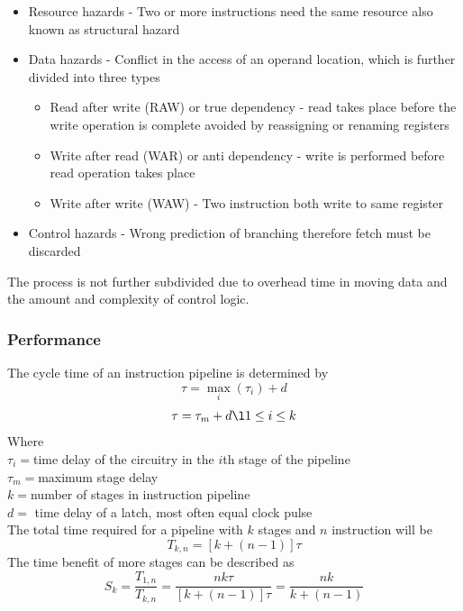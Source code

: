 \documentclass[12pt, a4paper]{article}
\begin{document}
			\begin{itemize}	
				\item Resource hazards - Two or more instructions need the same resource also known as structural hazard
				\item Data hazards - Conflict in the access of an operand location, which is further divided into three types
				\begin{itemize}
					\item Read after write (RAW) or true dependency - read takes place before the write operation is complete avoided by reassigning or renaming registers
					\item Write after read (WAR) or anti dependency - write is performed before read operation takes place
					\item Write after write (WAW) - Two instruction both write to same register
				\end{itemize}
				\item Control hazards - Wrong prediction of branching therefore fetch must be discarded
			\end{itemize}
			
			The process is not further subdivided due to overhead time in moving data and the amount and complexity of control logic.\\
			\subsubsection{Performance}
				The cycle time of an instruction pipeline is determined by
				$$\tau = \max_i(\tau_i)+d$$
				$$\tau = \tau_m+d\l1\leq i \leq k$$
				Where\\
				$\tau_i=$time delay of the circuitry in the $i$th stage of the pipeline\\
				$\tau_m=$maximum stage delay\\
				$k=$number of stages in instruction pipeline\\
				$d=$ time delay of a latch, most often equal clock pulse\\
				The total time required for a pipeline with $k$ stages and $n$ instruction will be 
				$$T_{k,n}=[k+(n-1)]\tau$$
				The time benefit of more stages can be described as
				$$S_k=\frac{T_{1,n}}{T_{k,n}}=\frac{nk\tau}{[k+(n-1)]\tau}=\frac{nk}{k+(n-1)}$$
\end{document}

